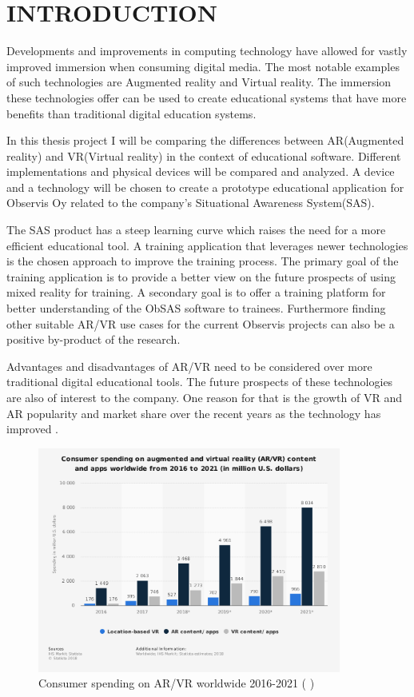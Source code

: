 \documentclass[12pt, a4paper,oneside, nocenter]{thesis}
\newcommand{\citeyeartitlexamkinline}[1]{(\usebibentry{#1}{title} \citeyear{#1})}
\begin{document}
\chapter{\MakeUppercase{Introduction}}
Developments and improvements in computing technology have allowed for vastly improved immersion when consuming digital media. The most notable examples of such technologies are Augmented reality and Virtual reality. The immersion these technologies offer can be used to create educational systems that have more benefits than traditional digital education systems. \par
In this thesis project I will be comparing the differences between AR(Augmented reality) and VR(Virtual reality) in the context of educational software. Different implementations and physical devices will be compared and analyzed. A device and a technology will be chosen to create a prototype educational application for Observis Oy related to the company's Situational Awareness System(SAS).
\par 
The SAS product has a steep learning curve which raises the need for a more efficient educational tool. A training application that leverages newer technologies is the chosen approach to improve the training process. The primary goal of the training application is to provide a better view on the future prospects of using mixed reality for training. A secondary goal is to offer a training platform for better understanding of the ObSAS software to trainees. Furthermore finding other suitable AR/VR use cases for the current Observis projects can also be a positive by-product of the research.
\par
Advantages and disadvantages of AR/VR need to be considered over more traditional digital educational tools. The future prospects of these technologies are also of interest to the company. One reason for that is the growth of VR and AR popularity and market share over the recent years as the technology has improved .
\begin{figure}[H]
	\centering
	\includegraphics[height=210pt]{ar-vr-consumer-spending}
	\caption{Consumer spending on AR/VR worldwide 2016-2021 \citeyeartitlexamkinline{ar-vr-chart}}
	\label{fig:ar-vr-consumer-spending}
\end{figure}
\end{document}
